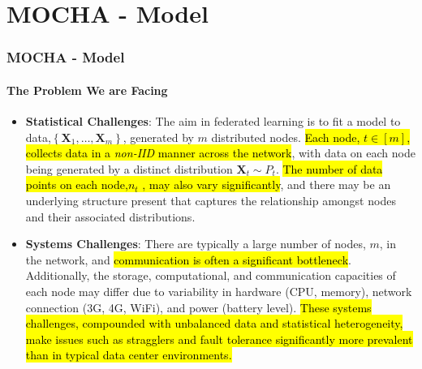 \documentclass[UTF8,aspectratio=169,presentation]{ctexbeamer}
\makeatletter
\let\HL\hl
\renewcommand\hl{%
  \let\set@color\beamerorig@set@color
  \let\reset@color\beamerorig@reset@color
  \HL}
\makeatother
\begin{document}
 \section{MOCHA - Model}

\begin{frame}[t]
  \frametitle{MOCHA - Model}
  \framesubtitle{The Problem We are Facing}

\begin{itemize}
  \item \textbf{Statistical Challenges}: The aim in federated learning is to fit a model to data,$\left\{\mathbf{X}_{1}, \ldots, \mathbf{X}_{m}\right\}$, generated by $m$ distributed nodes. \hl{Each node, $t \in[m]$, collects data in a \textit{non-IID} manner across the network}, with data on each node being generated by a distinct distribution $\mathbf{X}_{t} \sim P_{t}$. \hl{The number of data points on each node,$n_t$ , may also vary significantly}, and there may be an underlying structure present that captures the relationship amongst nodes and their associated distributions.
\item \textbf{Systems  Challenges}:  There are typically a large number of nodes, $m$,  in the network,  and \hl{communication is often a significant bottleneck}. Additionally, the storage, computational, and communication capacities of each node may differ due to variability in hardware (CPU, memory), network connection (3G, 4G, WiFi), and power (battery level). \hl{These systems challenges, compounded with unbalanced data and statistical heterogeneity, make issues such as stragglers and fault tolerance significantly more prevalent than in typical data center environments.}
\end{itemize}
\end{frame}


\newcommand{\eqone}{
   \min _{\mathbf{W}, \boldsymbol\Omega}\left\{\sum_{t=1}^{m} \sum_{i=1}^{n_{t}} \ell_{t}\left(\mathbf{w}_{t}^{T} \mathbf{x}_{t}^{i}, y_{t}^{i}\right)+\mathcal{R}(\mathbf{W}, \boldsymbol{\Omega})\right\}
}
\end{document}
